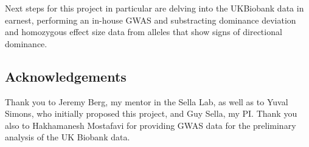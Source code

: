 \documentclass[a4paper,12pt]{article}
\begin{document}
Next steps for this project in particular are delving into the
UKBiobank data in earnest, performing an in-house GWAS and
substracting dominance deviation and homozygous effect size data from
alleles that show signs of directional dominance.

\subsection*{Acknowledgements}
Thank you to Jeremy Berg, my mentor in the Sella Lab, as well as to
Yuval Simons, who initially proposed this project, and Guy Sella, my
PI. Thank you also to Hakhamanesh Mostafavi for providing GWAS data
for the preliminary analysis of the UK Biobank data. 


\pagebreak





\end{document}
